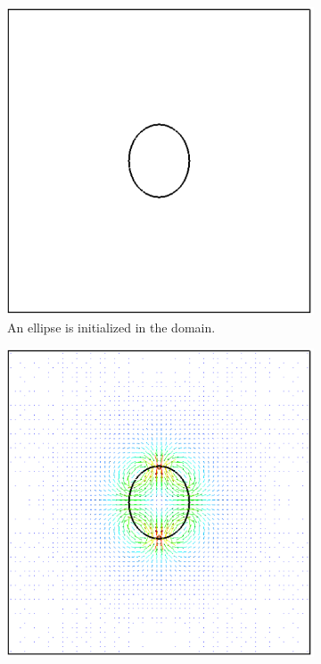 \begin{figure}[htbp]
	\centering
	\begin{subfigure}{.3\textwidth}
		\centering
		\includegraphics[width=1.0\linewidth]{figs/Odrop1}
		\caption{An ellipse is initialized in the domain.}
		\label{fig:Odrop1}
	\end{subfigure}%
\hfill
	\begin{subfigure}{0.3\textwidth}
		\centering
		\includegraphics[width=1.0\linewidth]{figs/Odrop2}

\end{subfigure}
\end{figure}
